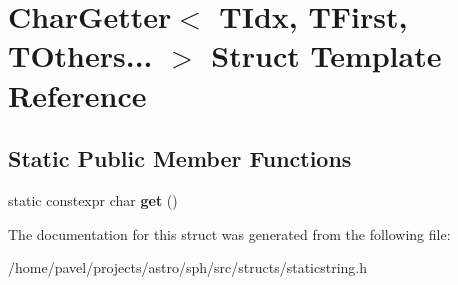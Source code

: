 \hypertarget{structCharGetter_3_01TIdx_00_01TFirst_00_01TOthers_8_8_8_01_4}{}\section{Char\+Getter$<$ T\+Idx, T\+First, T\+Others... $>$ Struct Template Reference}
\label{structCharGetter_3_01TIdx_00_01TFirst_00_01TOthers_8_8_8_01_4}
\subsection*{Static Public Member Functions}
\begin{DoxyCompactItemize}
\item 
\hypertarget{structCharGetter_3_01TIdx_00_01TFirst_00_01TOthers_8_8_8_01_4_a1d1cd97cc5151fe77693bc7ff4eca581}{}\label{structCharGetter_3_01TIdx_00_01TFirst_00_01TOthers_8_8_8_01_4_a1d1cd97cc5151fe77693bc7ff4eca581} 
static constexpr char {\bfseries get} ()
\end{DoxyCompactItemize}


The documentation for this struct was generated from the following file\+:\begin{DoxyCompactItemize}
\item 
/home/pavel/projects/astro/sph/src/structs/staticstring.\+h\end{DoxyCompactItemize}
